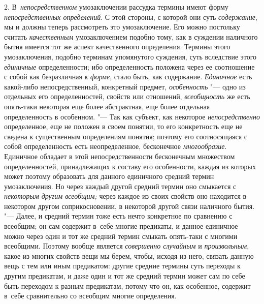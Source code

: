 2. В~{\em непосредственном}
умозаключении рассудка термины имеют форму
{\em непосредственных определений}.
С этой стороны, с которой они суть
{\em содержание}, мы и
должны теперь рассмотреть это умозаключение. Его можно постольку считать
{\em качественным}
умозаключением подобно тому, как в суждении наличного бытия
имеется тот же аспект качественного определения. Термины этого
умозаключения, подобно терминам упомянутого суждения, суть вследствие этого
{\em единичные}
определенности; ибо определенность положена через ее
соотношение с собой как безразличная к
{\em форме}, стало быть,
как содержание. {\em Единичное}
есть какой-либо непосредственный, конкретный предмет,
{\em особенность} "--- одно
из отдельных его определенностей, свойств или отношений,
{\em всеобщность} же есть
опять-таки некоторая еще более абстрактная, еще более отдельная
определенность в особенном. "--- Так как субъект, как некоторое
{\em непосредственно}
определенное, еще не положен в своем понятии, то его
конкретность еще не сведена к существенным определениям понятия; поэтому
его соотносящаяся с собой определенность есть
неопределенное, бесконечное
{\em многообразие}.
Единичное обладает в этой непосредственности бесконечным
множеством определенностей, принадлежащих к составу его особенности, каждая
из которых может поэтому образовать для данного единичного средний термин
умозаключения. Но через каждый другой средний термин оно смыкается с
{\em некоторым другим всеобщим;}
через каждое из своих свойств оно находится в некотором
другом соприкосновении, в некоторой другой связи наличного бытия. "---
Далее, и средний термин тоже есть нечто конкретное по
сравнению с всеобщим; он сам содержит в~себе многие предикаты, и данное
единичное можно через один и тот же средний термин смыкать опять-таки с
многими всеобщими. Поэтому вообще является
{\em совершенно случайным}
и {\em произвольным},
какое из многих свойств вещи мы берем, чтобы, исходя из него,
связать данную вещь с тем или иным предикатом: другие средние термины суть
переходы к другим предикатам, и даже один и тот же средний термин может сам
по себе быть переходом к разным предикатам, потому что он, как особенное,
содержит в~себе сравнительно со всеобщим многие определения.

